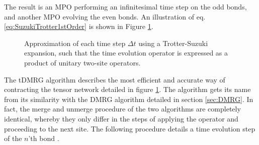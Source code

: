 The result is an MPO performing an infinitesimal time step on the odd bonds, and another MPO evolving the even bonds. An illustration of eq. \eqref{eq:SuzukiTrotter1stOrder} is shown in Figure \ref{fig:oddevenops}.
\begin{figure}[h!]
	\centering
	
	\caption{Approximation of each time step $\Delta t$ using a Trotter-Suzuki expansion, such that the time evolution operator is expressed as a product of unitary two-site operators.}
	\label{fig:oddevenops}
\end{figure}
The tDMRG algorithm describes the most efficient and accurate way of contracting the tensor network detailed in figure \ref{fig:oddevenops}. The algorithm gets its name from its similarity with the DMRG algorithm detailed in section \ref{sec:DMRG}. In fact, the merge and unmerge procedure of the two algorithms are completely identical, whereby they only differ in the steps of applying the operator and proceeding to the next site. The following procedure details a time evolution step of the $n$'th bond \cite{schollwock}.

